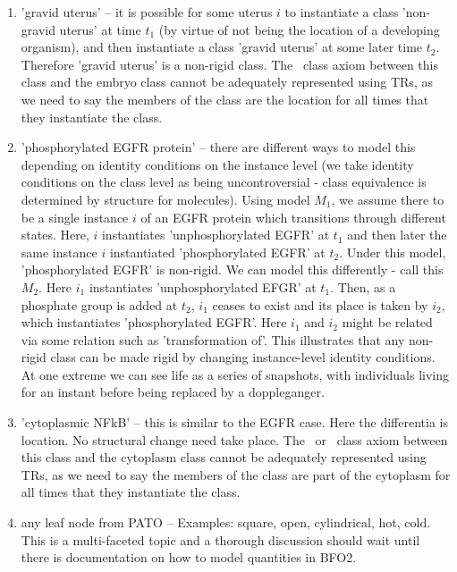 \documentclass{bioinfo}
\begin{document}
\begin{enumerate}
  \item 'gravid uterus' -- it is possible for some uterus $i$ to
    instantiate a class 'non-gravid uterus' at time $t_1$ (by virtue
    of not being the location of a developing organism), and then
    instantiate a class 'gravid uterus' at some later time
    $t_2$. Therefore 'gravid uterus' is a non-rigid class. The
    \ class axiom between this class and the embryo
    class cannot be adequately represented using TRs, as we need to
    say the members of the class are the location for all times that
    they instantiate the class.


  \item 'phosphorylated EGFR protein' -- there are different ways to
    model this depending on identity conditions on the instance level
    (we take identity conditions on the class level as being
    uncontroversial - class equivalence is determined by structure for
    molecules). Using model $M_1$, we assume there to be a single
    instance $i$ of an EGFR protein which transitions through
    different states. Here, $i$ instantiates 'unphosphorylated EGFR'
    at $t_1$ and then later the same instance $i$ instantiated
    'phosphorylated EGFR' at $t_2$. Under this model, 'phosphorylated
    EGFR' is non-rigid. We can model this differently - call this
    $M_2$. Here $i_1$ instantiates 'unphosphorylated EFGR' at
    $t_1$. Then, as a phosphate group is added at $t_2$, $i_1$ ceases
    to exist and its place is taken by $i_2$, which instantiates
    'phosphorylated EGFR'. Here $i_1$ and $i_2$ might be related via
    some relation such as 'transformation of'. This illustrates that
    any non-rigid class can be made rigid by changing instance-level
    identity conditions. At one extreme we can see life as a series of
    snapshots, with individuals living for an instant before being
    replaced by a doppleganger.

  \item 'cytoplasmic NFkB' -- this is similar to the EGFR case. Here
    the differentia is location. No structural change need take
    place. The \ or \ class axiom between
    this class and the cytoplasm class cannot be adequately
    represented using TRs, as we need to say the members of the class
    are part of the cytoplasm for all times that they instantiate the
    class.

  \item any leaf node from PATO -- Examples: square, open,
    cylindrical, hot, cold. This is a multi-faceted topic and a
    thorough discussion should wait until there is documentation on
    how to model quantities in BFO2.

\end{enumerate}
\end{document}
